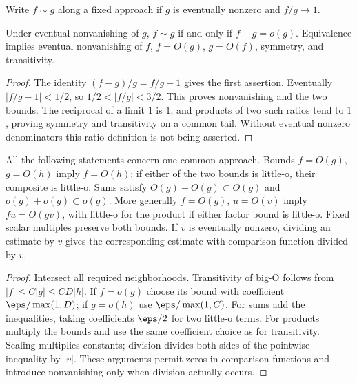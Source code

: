 \begin{definition}
Write $f\sim g$ along a fixed approach if $g$ is eventually nonzero and $f/g\to1$.
\end{definition}
\begin{proposition}
Under eventual nonvanishing of $g$, $f\sim g$ if and only if $f-g=o(g)$. Equivalence implies eventual nonvanishing of $f$, $f=O(g)$, $g=O(f)$, symmetry, and transitivity.
\end{proposition}
\begin{proof}
The identity $(f-g)/g=f/g-1$ gives the first assertion. Eventually $|f/g-1|<1/2$, so $1/2<|f/g|<3/2$. This proves nonvanishing and the two bounds. The reciprocal of a limit $1$ is $1$, and products of two such ratios tend to $1$, proving symmetry and transitivity on a common tail. Without eventual nonzero denominators this ratio definition is not being asserted.
\end{proof}

\begin{proposition}
All the following statements concern one common approach. Bounds $f=O(g)$, $g=O(h)$ imply $f=O(h)$; if either of the two bounds is little-o, their composite is little-o. Sums satisfy $O(g)+O(g)\subset O(g)$ and $o(g)+o(g)\subset o(g)$. More generally $f=O(g)$, $u=O(v)$ imply $fu=O(gv)$, with little-o for the product if either factor bound is little-o. Fixed scalar multiples preserve both bounds. If $v$ is eventually nonzero, dividing an estimate by $v$ gives the corresponding estimate with comparison function divided by $v$.
\end{proposition}
\begin{proof}
Intersect all required neighborhoods. Transitivity of big-O follows from $|f|\le C|g|\le CD|h|$. If $f=o(g)$ choose its bound with coefficient $\eps/\max(1,D)$; if $g=o(h)$ use $\eps/\max(1,C)$. For sums add the inequalities, taking coefficients $\eps/2$ for two little-o terms. For products multiply the bounds and use the same coefficient choice as for transitivity. Scaling multiplies constants; division divides both sides of the pointwise inequality by $|v|$. These arguments permit zeros in comparison functions and introduce nonvanishing only when division actually occurs.
\end{proof}

